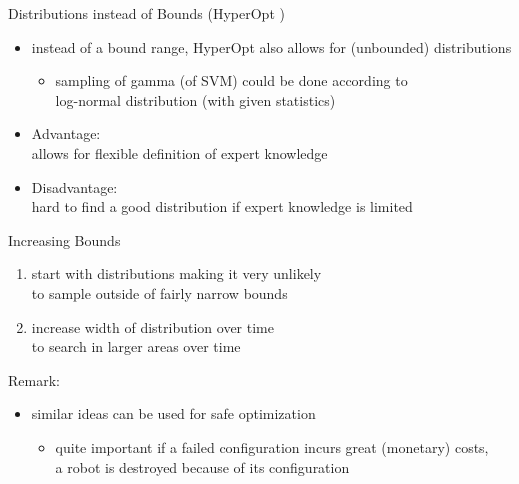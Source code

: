 \begin{frame}[c]{Distributions instead of Bounds (HyperOpt )}

\begin{itemize}
  \item instead of a bound range, HyperOpt also allows for (unbounded) distributions
  \begin{itemize}
    \item sampling of gamma (of SVM) could be done according to\\ log-normal distribution (with given statistics) 
  \end{itemize}
  \item Advantage:\\ allows for flexible definition of expert knowledge
  \item Disadvantage:\\ hard to find a good distribution if expert knowledge is limited
\end{itemize}

\end{frame}
\begin{frame}[c]{Increasing Bounds }

\begin{enumerate}
  \item start with distributions making it very unlikely\\ to sample outside of fairly narrow bounds
  \item increase width of distribution over time\\ to search in larger areas over time
\end{enumerate}

\bigskip
\pause

Remark:
\begin{itemize}
  \item similar ideas can be used for safe optimization
  \begin{itemize}
    \item quite important if a failed configuration incurs great (monetary) costs, \\
          a robot is destroyed because of its configuration
  \end{itemize}
\end{itemize}

\end{frame}
